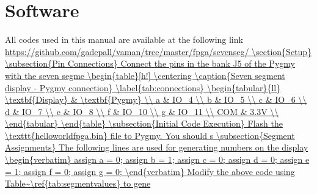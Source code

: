 \documentclass[12pt]{article}
\begin{document}
\section{Software}
All codes used in this manual are available at the following link
\url{https://github.com/gadepall/vaman/tree/master/fpga/sevenseg/

\section{Setup}

\subsection{Pin Connections}
Connect the pins in the bank J5 of the Pygmy with the seven segme

\begin{table}[h!]
\centering
\caption{Seven segment display - Pygmy connection}
\label{tab:connections}
\begin{tabular}{ll}
\textbf{Display} & \textbf{Pygmy} \\
a & IO\_4 \\
b & IO\_5 \\
c & IO\_6 \\
d & IO\_7 \\
e & IO\_8 \\
f & IO\_10 \\
g & IO\_11 \\
COM & 3.3V \\
\end{tabular}
\end{table}

\subsection{Initial Code Execution}
Flash the \texttt{helloworldfpga.bin} file to Pygmy. You should s

\subsection{Segment Assignments}
The following lines are used for generating numbers on the display

\begin{verbatim}
assign a = 0;
assign b = 1;
assign c = 0;
assign d = 0;
assign e = 1;
assign f = 0;
assign g = 0;
\end{verbatim}

Modify the above code using Table~\ref{tab:segmentvalues} to gene

}
\end{document}
